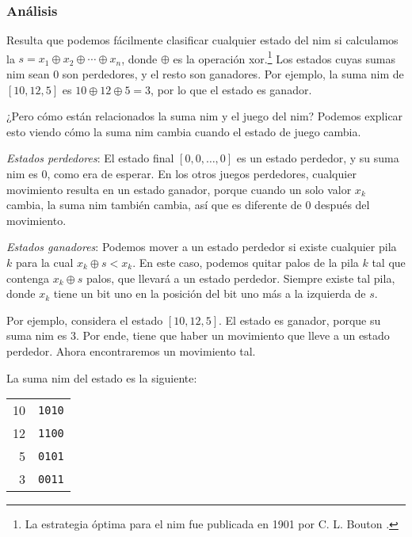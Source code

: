 \subsubsection{Análisis}

Resulta que podemos fácilmente clasificar cualquier estado del nim si
calculamos la  $s = x_1 \oplus x_2 \oplus \cdots \oplus x_n$,
donde $\oplus$ es la operación xor.\footnote{La estrategia óptima para el
    nim fue publicada en 1901 por C. L. Bouton \cite{bou01}.}
Los estados cuyas sumas nim sean 0 son perdedores, y el resto son ganadores.
Por ejemplo, la suma nim de $[10,12,5]$ es $10 \oplus 12 \oplus 5 = 3$,
por lo que el estado es ganador.

¿Pero cómo están relacionados la suma nim y el juego del nim? Podemos
explicar esto viendo cómo la suma nim cambia cuando el estado de juego
cambia.

\textit{Estados perdedores}: El estado final $[0,0,\ldots,0]$ es un
estado perdedor, y su suma nim es 0, como era de esperar. En los otros
juegos perdedores, cualquier movimiento resulta en un estado ganador,
porque cuando un solo valor $x_k$ cambia, la suma nim también cambia,
así que es diferente de 0 después del movimiento.

\textit{Estados ganadores}: Podemos mover a un estado perdedor si existe
cualquier pila $k$ para la cual $x_k \oplus s < x_k$. En este caso, podemos
quitar palos de la pila $k$ tal que contenga $x_k \oplus s$ palos, que
llevará a un estado perdedor. Siempre existe tal pila, donde $x_k$ tiene
un bit uno en la posición del bit uno más a la izquierda de $s$.

Por ejemplo, considera el estado $[10,12,5]$. El estado es ganador, porque
su suma nim es 3. Por ende, tiene que haber un movimiento que lleve a
un estado perdedor. Ahora encontraremos un movimiento tal.

La suma nim del estado es la siguiente:

\begin{center}
    \begin{tabular}{r|r}
        10 & \texttt{1010} \\
        12 & \texttt{1100} \\
        5  & \texttt{0101} \\
        \hline
        3  & \texttt{0011} \\
    \end{tabular}
\end{center}

